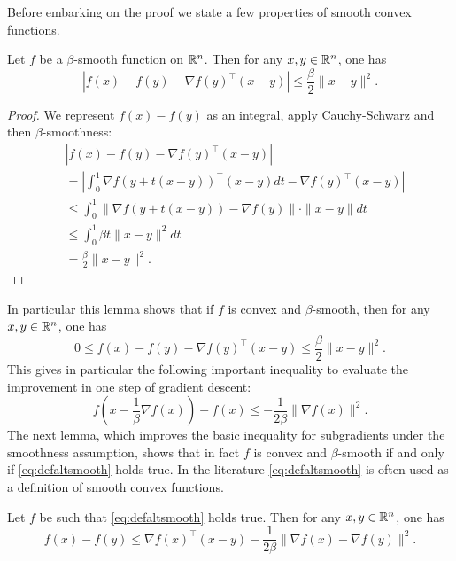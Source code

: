 Before embarking on the proof we state a few properties of smooth convex functions.
\begin{lemma} \label{lem:sand}
Let $f$ be a $\beta$-smooth function on $\mathbb{R}^n$. Then for any $x, y \in \mathbb{R}^n$, one has
$$|f(x) - f(y) - \nabla f(y)^{\top} (x - y)| \leq \frac{\beta}{2} \|x - y\|^2 .$$
\end{lemma}

\begin{proof}
We represent $f(x) - f(y)$ as an integral, apply Cauchy-Schwarz and then $\beta$-smoothness:
\begin{align*}
& |f(x) - f(y) - \nabla f(y)^{\top} (x - y)| \\
& = \left|\int_0^1 \nabla f(y + t(x-y))^{\top} (x-y) dt -  \nabla f(y)^{\top} (x - y) \right| \\
& \leq \int_0^1 \|\nabla f(y + t(x-y)) -  \nabla f(y)\| \cdot \|x - y\| dt \\
& \leq \int_0^1 \beta t \|x-y\|^2 dt \\
& = \frac{\beta}{2} \|x-y\|^2 .
\end{align*}
\end{proof}

In particular this lemma shows that if $f$ is convex and $\beta$-smooth, then for any $x, y \in \mathbb{R}^n$, one has
\begin{equation} \label{eq:defaltsmooth}
0 \leq f(x) - f(y) - \nabla f(y)^{\top} (x - y) \leq \frac{\beta}{2} \|x - y\|^2 .
\end{equation}
This gives in particular the following important inequality to evaluate the improvement in one step of gradient descent:
\begin{equation} \label{eq:onestepofgd}
f\left(x - \frac{1}{\beta} \nabla f(x)\right) - f(x) \leq - \frac{1}{2 \beta} \|\nabla f(x)\|^2 .
\end{equation}
The next lemma, which improves the basic inequality for subgradients under the smoothness assumption, shows that in fact $f$ is convex and $\beta$-smooth if and only if \eqref{eq:defaltsmooth} holds true. In the literature \eqref{eq:defaltsmooth} is often used as a definition of smooth convex functions.

\begin{lemma} \label{lem:2}
Let $f$ be such that \eqref{eq:defaltsmooth} holds true. Then for any $x, y \in \mathbb{R}^n$, one has
$$f(x) - f(y) \leq \nabla f(x)^{\top} (x - y) - \frac{1}{2 \beta} \|\nabla f(x) - \nabla f(y)\|^2 .$$
\end{lemma}

